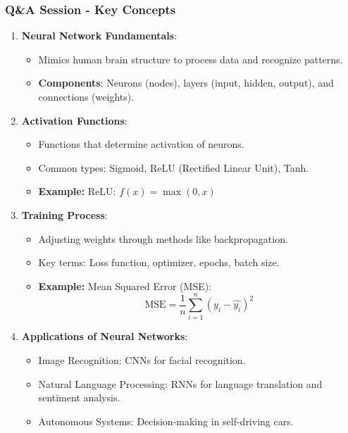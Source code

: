 \documentclass[aspectratio=169]{beamer}
\begin{document}
\begin{frame}[fragile]
    \frametitle{Q\&A Session - Key Concepts}
    \begin{enumerate}
        \item \textbf{Neural Network Fundamentals}:
        \begin{itemize}
            \item Mimics human brain structure to process data and recognize patterns.
            \item \textbf{Components}: Neurons (nodes), layers (input, hidden, output), and connections (weights).
        \end{itemize}

        \item \textbf{Activation Functions}:
        \begin{itemize}
            \item Functions that determine activation of neurons.
            \item Common types: Sigmoid, ReLU (Rectified Linear Unit), Tanh.
            \item \textbf{Example:} ReLU: \( f(x) = \max(0, x) \)
        \end{itemize}
        
        \item \textbf{Training Process}:
        \begin{itemize}
            \item Adjusting weights through methods like backpropagation.
            \item Key terms: Loss function, optimizer, epochs, batch size.
            \item \textbf{Example:} Mean Squared Error (MSE):
            \begin{equation}
                \text{MSE} = \frac{1}{n} \sum_{i=1}^{n} (y_i - \hat{y_i})^2
            \end{equation}
        \end{itemize}
        
        \item \textbf{Applications of Neural Networks}:
        \begin{itemize}
            \item Image Recognition: CNNs for facial recognition.
            \item Natural Language Processing: RNNs for language translation and sentiment analysis.
            \item Autonomous Systems: Decision-making in self-driving cars.
        \end{itemize}
    \end{enumerate}
\end{frame}
\end{document}
